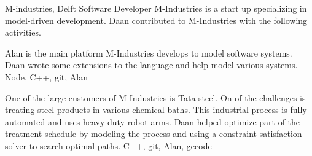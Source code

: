   \begin{workExperience}{M-industries, Delft}%
  {Software Developer}{}
  M-Industries is a start up specializing in model-driven development. Daan
  contributed to M-Industries with the following activities.

  Alan is the main platform M-Industries develops to model software systems.
  Daan wrote some extensions to the language and help model various systems.
  \technics Node, C++, git, Alan

  One of the large customers of M-Industries is Tata steel. On of the challenges
  is treating steel products in various chemical baths. This industrial process
  is fully automated and uses heavy duty robot arms.
  Daan helped optimize part of the treatment schedule by modeling the process
  and using a constraint satisfaction solver to search optimal paths.
  \technics C++, git, Alan, gecode

  
  \end{workExperience}


